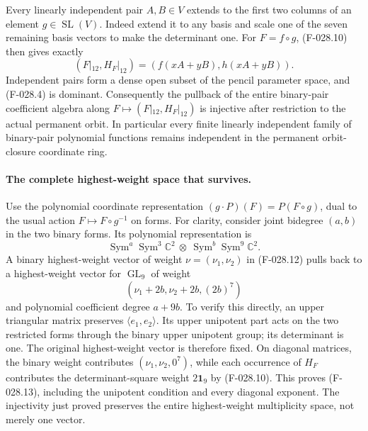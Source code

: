 Every linearly independent pair \(A,B\in V\) extends
to the first two columns of an element \(g\in\operatorname{SL}(V)\).
Indeed extend it to any basis and scale one of the seven
remaining basis vectors to make the determinant one.
For \(F=f\circ g\), (F-028.10) then gives exactly
\[
                     (F|_{12},H_F|_{12})
                         =(f(xA+yB),h(xA+yB)).
                                                               \tag{F-028.11}
\]
Independent pairs form a dense open subset of the pencil
parameter space, and (F-028.4) is dominant. Consequently
the pullback of the entire binary-pair coefficient algebra
along \(F\mapsto(F|_{12},H_F|_{12})\) is injective after
restriction to the actual permanent orbit.
In particular every finite linearly independent family
of binary-pair polynomial functions remains independent
in the permanent orbit-closure coordinate ring.

\paragraph{The complete highest-weight space that survives.}
Use the polynomial coordinate representation
\((g\cdot P)(F)=P(F\circ g)\), dual to the usual action
\(F\mapsto F\circ g^{-1}\) on forms.
For clarity, consider joint bidegree \((a,b)\) in the
two binary forms. Its polynomial representation is
\[
             \operatorname{Sym}^a\operatorname{Sym}^3\mathbb C^2
                \ \otimes\
             \operatorname{Sym}^b\operatorname{Sym}^9\mathbb C^2.
                                                               \tag{F-028.12}
\]
A binary highest-weight vector of weight
\(\nu=(\nu_1,\nu_2)\) in (F-028.12) pulls back to a
highest-weight vector for \(\operatorname{GL}_9\) of weight
\[
                  (\nu_1+2b,\nu_2+2b,(2b)^7)
                                                               \tag{F-028.13}
\]
and polynomial coefficient degree \(a+9b\).
To verify this directly, an upper triangular matrix
preserves \(\langle e_1,e_2\rangle\).
Its upper unipotent part acts on the two restricted forms
through the binary upper unipotent group; its determinant
is one. The original highest-weight vector is therefore
fixed. On diagonal matrices, the binary weight contributes
\((\nu_1,\nu_2,0^7)\), while each occurrence of \(H_F\)
contributes the determinant-square weight \(2\mathbf1_9\)
by (F-028.10). This proves (F-028.13), including the
unipotent condition and every diagonal exponent.
The injectivity just proved preserves the entire
highest-weight multiplicity space, not merely one vector.

